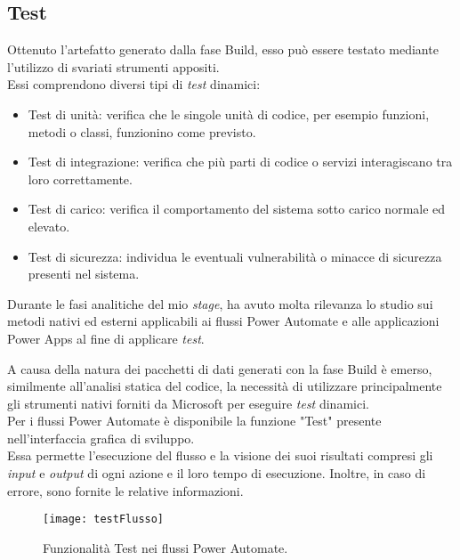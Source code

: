 \subsection{Test}
Ottenuto l'artefatto generato dalla fase Build, esso può essere testato mediante l'utilizzo di svariati strumenti appositi.\\
Essi comprendono diversi tipi di \emph{test} dinamici: 
\begin{itemize}
    \item Test di unità: verifica che le singole unità di codice, per esempio funzioni, metodi o classi, funzionino come previsto.
    \item Test di integrazione: verifica che più parti di codice o servizi interagiscano tra loro correttamente.
    \item Test di carico: verifica il comportamento del sistema sotto carico normale ed elevato.
    \item Test di sicurezza: individua le eventuali vulnerabilità o minacce di sicurezza presenti nel sistema. 
\end{itemize}
Durante le fasi analitiche del mio \emph{stage}, ha avuto molta rilevanza lo studio sui metodi nativi ed esterni applicabili ai flussi Power Automate e alle applicazioni Power Apps al fine di applicare \emph{test}. 

A causa della natura dei pacchetti di dati generati con la fase Build è emerso, similmente all'analisi statica del codice, la necessità di utilizzare principalmente gli strumenti nativi forniti da Microsoft per eseguire \emph{test} dinamici.\\
Per i flussi Power Automate è disponibile la funzione "Test" presente nell'interfaccia grafica di sviluppo.\\
Essa permette l'esecuzione del flusso e la visione dei suoi risultati compresi gli \emph{input} e \emph{output} di ogni azione e il loro tempo di esecuzione. 
Inoltre, in caso di errore, sono fornite le relative informazioni. 
\begin{figure}[htbp] 
    \centering 
    \texttt{[image: testFlusso]} 
    \caption{Funzionalità Test nei flussi Power Automate.}
    \label{fig:testFlusso}
\end{figure}

